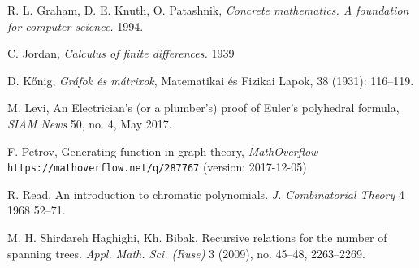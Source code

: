 \begin{thebibliography}{52}
 R. L. Graham, D. E. Knuth, O. Patashnik, 
\emph{Concrete mathematics. A foundation for computer science.}
1994.

 C. Jordan, 
\emph{Calculus of finite differences.}
1939

 D. K\H{o}nig, \emph{Gr\'{a}fok \'{e}s m\'{a}trixok}, Matematikai és Fizikai Lapok, 38 (1931): 116--119.

 M. Levi,
An Electrician’s (or a plumber’s)
proof of Euler’s polyhedral formula,
\emph{SIAM News} 50, no. 4, May 2017.

 F. Petrov, Generating function in graph theory,
\emph{MathOverflow}
\texttt{https://mathoverflow.net/q/287767} (version: 2017-12-05)

 R. Read, 
An introduction to chromatic polynomials.
\emph{J. Combinatorial Theory} 4 1968 52--71.

 M. H. Shirdareh Haghighi, Kh. Bibak, 
Recursive relations for the number of spanning trees. 
\emph{Appl. Math. Sci. (Ruse)} 3 (2009), no. 45--48, 2263--2269.
\end{thebibliography}

